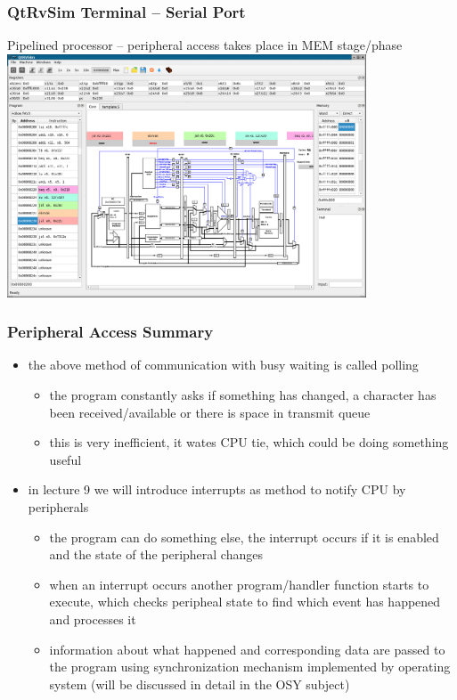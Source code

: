 \documentclass{beamer}
\begin{document}
\begin{frame}
\frametitle{QtRvSim Terminal -- Serial Port}
\begin{center}
Pipelined processor -- peripheral access takes place in MEM stage/phase
\includegraphics[width=0.8\textwidth]{fig/QtRvSim-serial-pipeline.png}
\end{center}
\end{frame}


\begin{frame}
\frametitle{Peripheral Access Summary}

\begin{itemize}
\item the above method of communication  with busy waiting is called polling
\begin{itemize}
\item the program constantly asks if something has changed, a character has been received/available or there is space in transmit queue
\item this is very inefficient, it wates CPU tie, which could be doing something useful
\end{itemize}
\item in lecture 9 we will introduce interrupts as method to notify CPU by peripherals
\begin{itemize}
\item the program can do something else, the interrupt occurs if it is enabled and the state of the peripheral changes
\item when an interrupt occurs another program/handler function starts to execute, which checks peripheal state to find which event has happened and processes it
\item information about what happened and corresponding data are passed to the program using synchronization mechanism implemented by operating system (will be discussed in detail in the OSY subject)
\end{itemize}
\end{itemize}

\end{frame}
\end{document}
